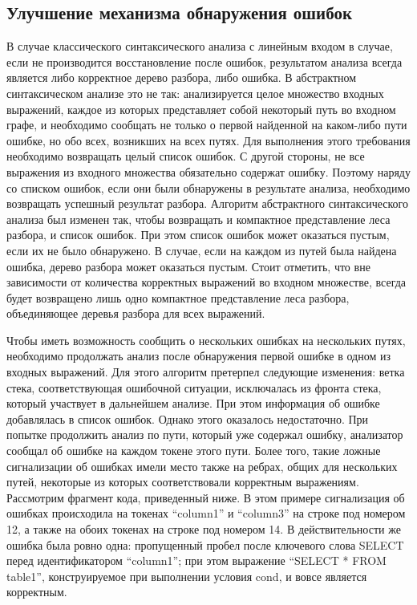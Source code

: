 \documentclass{matmex-diploma}
\begin{document}
\subsection{Улучшение механизма обнаружения ошибок}
В случае классического синтаксического анализа с линейным входом в случае, если 
не производится восстановление после ошибок, результатом анализа всегда является 
либо корректное дерево разбора, либо ошибка. В абстрактном синтаксическом анализе 
это не так: анализируется целое множество входных выражений, каждое из которых 
представляет собой некоторый путь во входном графе, и необходимо сообщать не только 
о первой найденной на каком-либо пути ошибке, но обо всех, возникших на всех путях. 
Для выполнения этого требования необходимо возвращать целый список ошибок. С другой 
стороны, не все выражения из входного множества обязательно содержат ошибку. 
Поэтому наряду со списком ошибок, если они были обнаружены в результате анализа, 
необходимо возвращать успешный результат разбора. Алгоритм абстрактного синтаксического 
анализа был изменен так, чтобы возвращать и компактное представление леса разбора, 
и список ошибок. При этом список ошибок может оказаться пустым, если их не было 
обнаружено. В случае, если на каждом из путей была найдена ошибка, дерево разбора 
может оказаться пустым. Стоит отметить, что вне зависимости от количества корректных 
выражений во входном множестве, всегда будет возвращено лишь одно компактное 
представление леса разбора, объединяющее деревья разбора для всех выражений.

Чтобы иметь возможность сообщить о нескольких ошибках на нескольких путях, 
необходимо продолжать анализ после обнаружения первой ошибке в одном из входных 
выражений. Для этого алгоритм претерпел следующие изменения: ветка стека, 
соответствующая ошибочной ситуации, исключалась из фронта стека, который участвует 
в дальнейшем анализе. При этом информация об ошибке добавлялась в список ошибок. 
Однако этого оказалось недостаточно. При попытке продолжить анализ по пути, 
который уже содержал ошибку, анализатор сообщал об ошибке на каждом токене этого 
пути. Более того, такие ложные сигнализации об ошибках имели место также на ребрах, 
общих для нескольких путей, некоторые из которых соответствовали корректным 
выражениям. Рассмотрим фрагмент кода, приведенный ниже. В этом примере сигнализация
об ошибках происходила на токенах “column1” 
и “column3” на строке под номером 12, а также на обоих токенах на строке под 
номером 14. В действительности же ошибка была ровно одна: пропущенный пробел после 
ключевого слова SELECT перед идентификатором “column1”; при этом выражение “SELECT 
* FROM table1”, конструируемое при выполнении условия cond, и вовсе является 
корректным.
\end{document}
